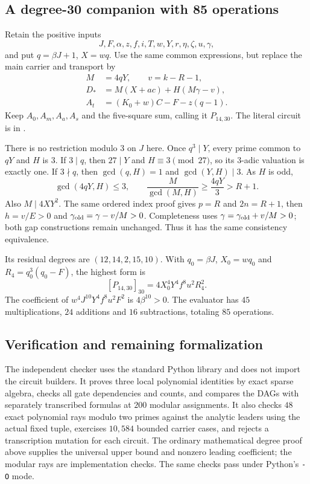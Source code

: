 \subsection{A degree-30 companion with 85 operations}

Retain the positive inputs
\[
 J,F,\alpha,z,f,i,T,w,Y,r,\eta,\zeta,u,\gamma,
\]
and put $q=\beta J+1$, $X=wq$. Use the same common expressions, but replace
the main carrier and transport by
\begin{align*}
 M&=4qY,\qquad v=k-R-1,\\
 D_*&=M(X+ac)+H(M\gamma-v),\\
 A_t&=(K_0+w)C-F-z(q-1).
\end{align*}
Keep $A_0,A_m,A_a,A_s$ and the five-square sum, calling it $P_{14,30}$.
The literal circuit is in .

There is no restriction modulo $3$ on $J$ here. Once $q^3\mid Y$, every
prime common to $qY$ and $H$ is $3$. If $3\mid q$, then $27\mid Y$ and
$H\equiv3\pmod{27}$, so its $3$-adic valuation is exactly one. If
$3\nmid q$, then $\gcd(q,H)=1$ and $\gcd(Y,H)\mid3$. As $H$ is odd,
\[
 \gcd(4qY,H)\le3,
 \qquad\frac M{\gcd(M,H)}\ge\frac{4qY}{3}>R+1.
\]
Also $M\mid4XY^2$. The same ordered index proof gives $p=R$ and
$2n=R+1$, then $h=v/E>0$ and $\gamma_{\rm old}=\gamma-v/M>0$.
Completeness uses $\gamma=\gamma_{\rm old}+v/M>0$; both gap
constructions remain unchanged. Thus it has the same consistency
equivalence.

Its residual degrees are $(12,14,2,15,10)$. With
$q_0=\beta J$, $X_0=wq_0$ and $R_4=q_0^3(q_0-F)$, the highest form is
\[
 [P_{14,30}]_{30}=4X_0^4Y^4f^8u^2R_4^2.
\]
The coefficient of $w^4J^{10}Y^4f^8u^2F^2$ is $4\beta^{10}>0$.
The evaluator has $45$ multiplications, $24$ additions and $16$
subtractions, totaling $85$ operations.

\subsection{Verification and remaining formalization}

The independent checker uses the standard Python library and does not
import the circuit builders. It proves three local polynomial identities
by exact sparse algebra, checks all gate dependencies and counts, and
compares the DAGs with separately transcribed formulas at $200$ modular
assignments. It also checks $48$ exact polynomial rays modulo two primes
against the analytic leaders using the actual fixed tuple, exercises
$10{,}584$ bounded carrier cases, and rejects a transcription mutation
for each circuit. The ordinary mathematical degree proof above supplies
the universal upper bound and nonzero leading coefficient; the modular
rays are implementation checks. The same checks pass under Python's
\texttt{-O} mode.

